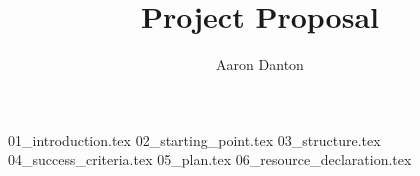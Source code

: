 \documentclass[12pt, twoside, openright]{article}
\title{Project Proposal}
\author{Aaron Danton}
\begin{document}


{01_introduction.tex}
{02_starting_point.tex}
{03_structure.tex}
{04_success_criteria.tex}
{05_plan.tex}
{06_resource_declaration.tex}
\end{document}
